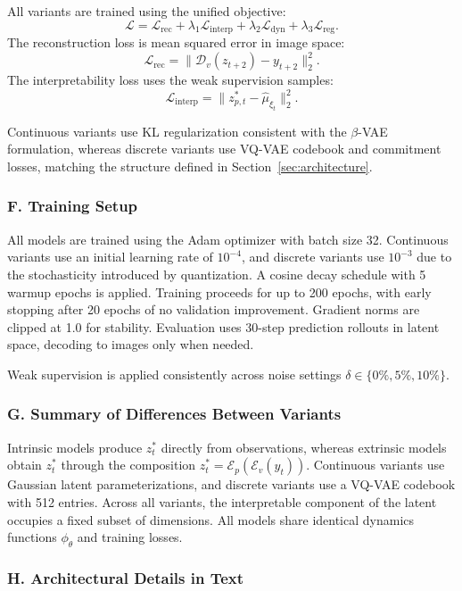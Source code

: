 \documentclass[nonacm,sigconf]{acmart}
\begin{document}
All variants are trained using the unified objective:
\[
\mathcal{L} =
\mathcal{L}_{\text{rec}}
+ \lambda_1 \mathcal{L}_{\text{interp}}
+ \lambda_2 \mathcal{L}_{\text{dyn}}
+ \lambda_3 \mathcal{L}_{\text{reg}}.
\]
The reconstruction loss is mean squared error in image space:
\[
\mathcal{L}_{\text{rec}}
= \| \mathcal{D}_v(z_{t+2}) - y_{t+2} \|_2^2.
\]
The interpretability loss uses the weak supervision samples:
\[
\mathcal{L}_{\text{interp}}
= \| z^{*}_{p,t} - \hat{\mu}_{\xi_t} \|_2^2.
\]

Continuous variants use KL regularization consistent with the $\beta$-VAE
formulation, whereas discrete variants use VQ-VAE codebook and commitment
losses, matching the structure defined in Section~\ref{sec:architecture}.

\subsubsection*{F. Training Setup}

All models are trained using the Adam optimizer with batch size 32. Continuous
variants use an initial learning rate of $10^{-4}$, and discrete variants use
$10^{-3}$ due to the stochasticity introduced by quantization. A cosine decay
schedule with 5 warmup epochs is applied. Training proceeds for up to 200
epochs, with early stopping after 20 epochs of no validation improvement.  
Gradient norms are clipped at 1.0 for stability.  
Evaluation uses 30-step prediction rollouts in latent space, decoding to images
only when needed.

Weak supervision is applied consistently across noise settings
$\delta \in \{0\%, 5\%, 10\%\}$.

\subsubsection*{G. Summary of Differences Between Variants}

Intrinsic models produce $z^{*}_t$ directly from observations, whereas extrinsic
models obtain $z^{*}_t$ through the composition
$z^*_t = \mathcal{E}_p(\mathcal{E}_v(y_t))$.  
Continuous variants use Gaussian latent parameterizations, and discrete variants
use a VQ-VAE codebook with 512 entries.  
Across all variants, the interpretable component of the latent occupies a fixed
subset of dimensions. All models share identical dynamics functions
$\phi_\theta$ and training losses.

\subsubsection*{H. Architectural Details in Text}
\end{document}
